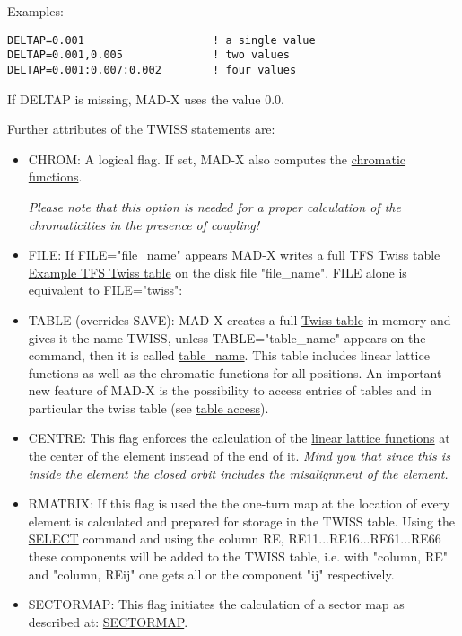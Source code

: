 Examples: 
\begin{verbatim}
DELTAP=0.001                    ! a single value
DELTAP=0.001,0.005              ! two values
DELTAP=0.001:0.007:0.002        ! four values
\end{verbatim} If DELTAP is missing, MAD-X uses the value 0.0. 

Further attributes of the TWISS statements are: 
\begin{itemize}
	\item CHROM: A logical flag. If set, MAD-X also computes the     \href{../Introduction/tables.html#chrom}{chromatic     functions}. 

\textit{Please note that this option is needed for a proper calculation of the chromaticities in the presence of coupling!}
	\item FILE: If FILE="file\_name" appears MAD-X writes a full TFS Twiss table \href{../Introduction/select.html#tfs}{Example TFS Twiss table} on the disk file "file\_name". FILE alone is equivalent to FILE="twiss": 
	\item TABLE (overrides SAVE): MAD-X creates a full \href{../Introduction/tables.html#linear}{Twiss table} in memory and gives it the name TWISS, unless TABLE="table\_name" appears on the command, then it is called \href{../Introduction/label.html}{table\_name}. This table includes linear lattice functions as well as the chromatic functions for all positions. An important new feature of MAD-X is the possibility to access entries of tables and in particular the twiss table (see \href{../Introduction/expression.html#table}{table access}).   
	\item CENTRE: This flag enforces the calculation of the \href{../Introduction/tables.html#linear}{linear lattice functions} at the center of the element instead of the end of it. \textit{ Mind you that since this is inside the element the closed orbit includes the misalignment of the element.}
	\item RMATRIX: If this flag is used the the one-turn map at the location of every element is calculated and prepared for storage in the TWISS table. Using the \href{../Introduction/select.html}{SELECT} command and using the column RE, RE11...RE16...RE61...RE66 these components will be added to the TWISS table, i.e. with "column, RE" and "column, REij" one gets all or the component "ij" respectively.   
	\item SECTORMAP: This flag initiates the calculation of a sector map as described at: \href{../Introduction/sectormap.html}{SECTORMAP}.   

\end{itemize}
